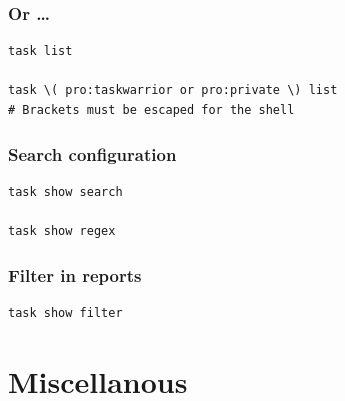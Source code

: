 \documentclass[t]{beamer}
\begin{document}
\begin{frame}[fragile]\frametitle{Or \ldots}
    \vfill
    \begin{lstlisting}
task list

task \( pro:taskwarrior or pro:private \) list
# Brackets must be escaped for the shell
\end{lstlisting}
\end{frame}

\begin{frame}[fragile]\frametitle{Search configuration}
    \vfill
    \begin{lstlisting}
task show search

task show regex\end{lstlisting}
\end{frame}

\begin{frame}[fragile]\frametitle{Filter in reports}
    \vfill
    \begin{lstlisting}
task show filter\end{lstlisting}
\end{frame}

\section{Miscellanous}
\end{document}
